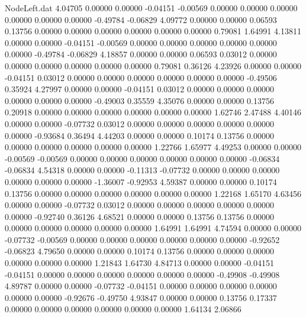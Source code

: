 \begin{filecontents}{NodeLeft.dat}
   4.04705    0.00000    0.00000    -0.04151   -0.00569    0.00000    0.00000    0.00000    0.00000    0.00000    0.00000   -0.49784   -0.06829
   4.09772    0.00000    0.00000     0.06593    0.13756    0.00000    0.00000    0.00000    0.00000    0.00000    0.00000    0.79081    1.64991
   4.13811    0.00000    0.00000    -0.04151   -0.00569    0.00000    0.00000    0.00000    0.00000    0.00000    0.00000   -0.49784   -0.06829
   4.18857    0.00000    0.00000     0.06593    0.03012    0.00000    0.00000    0.00000    0.00000    0.00000    0.00000    0.79081    0.36126
   4.23926    0.00000    0.00000    -0.04151    0.03012    0.00000    0.00000    0.00000    0.00000    0.00000    0.00000   -0.49506    0.35924
   4.27997    0.00000    0.00000    -0.04151    0.03012    0.00000    0.00000    0.00000    0.00000    0.00000    0.00000   -0.49003    0.35559
   4.35076    0.00000    0.00000     0.13756    0.20918    0.00000    0.00000    0.00000    0.00000    0.00000    0.00000    1.62746    2.47488
   4.40146    0.00000    0.00000    -0.07732    0.03012    0.00000    0.00000    0.00000    0.00000    0.00000    0.00000   -0.93684    0.36494
   4.44203    0.00000    0.00000     0.10174    0.13756    0.00000    0.00000    0.00000    0.00000    0.00000    0.00000    1.22766    1.65977
   4.49253    0.00000    0.00000    -0.00569   -0.00569    0.00000    0.00000    0.00000    0.00000    0.00000    0.00000   -0.06834   -0.06834
   4.54318    0.00000    0.00000    -0.11313   -0.07732    0.00000    0.00000    0.00000    0.00000    0.00000    0.00000   -1.36007   -0.92953
   4.59387    0.00000    0.00000     0.10174    0.13756    0.00000    0.00000    0.00000    0.00000    0.00000    0.00000    1.22168    1.65170
   4.63456    0.00000    0.00000    -0.07732    0.03012    0.00000    0.00000    0.00000    0.00000    0.00000    0.00000   -0.92740    0.36126
   4.68521    0.00000    0.00000     0.13756    0.13756    0.00000    0.00000    0.00000    0.00000    0.00000    0.00000    1.64991    1.64991
   4.74594    0.00000    0.00000    -0.07732   -0.00569    0.00000    0.00000    0.00000    0.00000    0.00000    0.00000   -0.92652   -0.06823
   4.79650    0.00000    0.00000     0.10174    0.13756    0.00000    0.00000    0.00000    0.00000    0.00000    0.00000    1.21843    1.64730
   4.84713    0.00000    0.00000    -0.04151   -0.04151    0.00000    0.00000    0.00000    0.00000    0.00000    0.00000   -0.49908   -0.49908
   4.89787    0.00000    0.00000    -0.07732   -0.04151    0.00000    0.00000    0.00000    0.00000    0.00000    0.00000   -0.92676   -0.49750
   4.93847    0.00000    0.00000     0.13756    0.17337    0.00000    0.00000    0.00000    0.00000    0.00000    0.00000    1.64134    2.06866

\end{filecontents}
